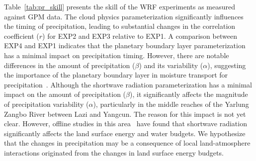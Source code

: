 \documentclass[draft]{agujournal2019}
\begin{document}
Table~\ref{tab:pr_skill} presents the skill of the WRF experiments as measured against GPM data. The cloud physics parameterization significantly influences the timing of precipitation, leading to substantial changes in the correlation coefficient ($r$) for EXP2 and EXP3 relative to EXP1. A comparison between EXP4 and EXP1 indicates that the planetary boundary layer parameterization has a minimal impact on precipitation timing. However, there are notable differences in the amount of precipitation ($\beta$) and its variability ($\alpha$), suggesting the importance of the planetary boundary layer in moisture transport for precipitation~\cite{wang2020GRL}. Although the shortwave radiation parameterization has a minimal impact on the amount of precipitation ($\beta$), it significantly affects the magnitude of precipitation variability ($\alpha$), particularly in the middle reaches of the Yarlung Zangbo River between Lazi and Yangcun. The reason for this impact is not yet clear. However, offline studies in this area~\cite{lei2025JH} have found that shortwave radiation significantly affects the land surface energy and water budgets. We hypothesize that the changes in precipitation may be a consequence of local land-atmosphere interactions originated from the changes in land surface energy budgets.
\end{document}
